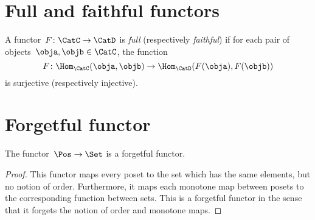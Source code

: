 
\section{Full and faithful functors}
\begin{ctdefinition}
  \label{def:functorfullfaith}
  A functor~$F\colon \CatC \to \CatD$ is \emph{full} (respectively \emph{faithful}) if for each pair of objects~$\obja,\objb\in \CatC$, the function
  \begin{equation}
    F\colon \Hom_\CatC(\obja,\objb)\to \Hom_\CatD(F(\obja),F(\objb))
  \end{equation}
  is surjective (respectively injective).
\end{ctdefinition}


\section{Forgetful functor}


\begin{lemma}
  The functor~$\Pos \to \Set$ is a forgetful functor.
\end{lemma}
\begin{proof}
  This functor maps every poset to the set which has the same elements, but no notion of order. Furthermore, it maps each monotone map between posets to the corresponding function between sets. This is a forgetful functor in the sense that it forgets the notion of order and monotone maps.
\end{proof}

